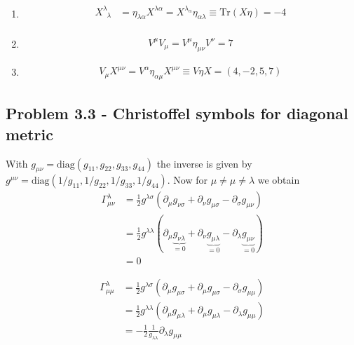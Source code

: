 \documentclass[10pt,a4paper]{book}
\theoremstyle{definition}
\begin{document}
\begin{enumerate}
\item 
\begin{align}
 X^\lambda_{\;\;\lambda}&=\eta_{\lambda\alpha}X^{\lambda\alpha}=X^{\lambda_\alpha}\eta_{\alpha\lambda}\equiv  \text{Tr}(X\eta)=-4\\
\end{align}

\item 
\begin{align}
V^\mu V_\mu = V^\mu \eta_{\mu\nu}V^\nu=7
\end{align}

\item 
\begin{align}
V_\mu X^{\mu\nu} = V^\alpha\eta_{\alpha\mu} X^{\mu\nu}\equiv V\eta X=(4,-2,5,7)
\end{align}
\end{enumerate}


\subsection{Problem 3.3 - Christoffel symbols for diagonal metric}
With $g_{\mu\nu}=\text{diag}(g_{11},g_{22},g_{33},g_{44})$ the inverse is given by $g^{\mu\nu}=\text{diag}(1/g_{11},1/g_{22},1/g_{33},1/g_{44})$. Now for $\mu\neq\mu\neq\lambda$ we obtain
\begin{align}
\Gamma^\lambda_{\mu\nu}
&=\frac{1}{2}g^{\lambda\sigma}(\partial_\mu g_{\nu\sigma}+\partial_\nu g_{\mu\sigma}-\partial_\sigma g_{\mu\nu})\\
&=\frac{1}{2}g^{\lambda\lambda}(\partial_\mu \underbrace{g_{\nu\lambda}}_{=0}+\partial_\nu \underbrace{g_{\mu\lambda}}_{=0}-\partial_\lambda \underbrace{g_{\mu\nu}}_{=0})\\
&=0
\end{align}

\begin{align}
\Gamma^\lambda_{\mu\mu}
&=\frac{1}{2}g^{\lambda\sigma}(\partial_\mu g_{\mu\sigma}+\partial_\mu g_{\mu\sigma}-\partial_\sigma g_{\mu\mu})\\
&=\frac{1}{2}g^{\lambda\lambda}(\partial_\mu g_{\mu\lambda}+\partial_\mu g_{\mu\lambda}-\partial_\lambda g_{\mu\mu})\\
&=-\frac{1}{2}\frac{1}{g_{\lambda\lambda}}\partial_\lambda g_{\mu\mu}
\end{align}
\end{document}
